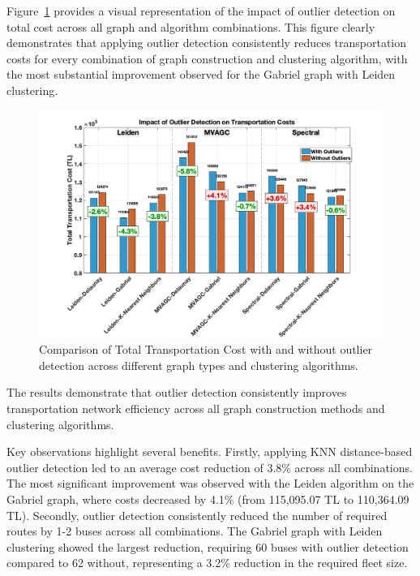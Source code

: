 Figure~\ref{fig:outlier_cost_comparison} provides a visual representation of the impact of outlier detection on total cost across all graph and algorithm combinations. This figure clearly demonstrates that applying outlier detection consistently reduces transportation costs for every combination of graph construction and clustering algorithm, with the most substantial improvement observed for the Gabriel graph with Leiden clustering.

\begin{figure}[h]
    \centering
    \includegraphics[width=1.0\textwidth]{img/outlier_cost_comparison}
    \caption{Comparison of Total Transportation Cost with and without outlier detection across different graph types and clustering algorithms.}
    \label{fig:outlier_cost_comparison}
\end{figure}


The results demonstrate that outlier detection consistently improves transportation network efficiency across all graph construction methods and clustering algorithms.

Key observations highlight several benefits. Firstly, applying KNN distance-based outlier detection led to an average cost reduction of 3.8\% across all combinations. The most significant improvement was observed with the Leiden algorithm on the Gabriel graph, where costs decreased by 4.1\% (from 115,095.07 TL to 110,364.09 TL). Secondly, outlier detection consistently reduced the number of required routes by 1-2 buses across all combinations. The Gabriel graph with Leiden clustering showed the largest reduction, requiring 60 buses with outlier detection compared to 62 without, representing a 3.2\% reduction in the required fleet size.

